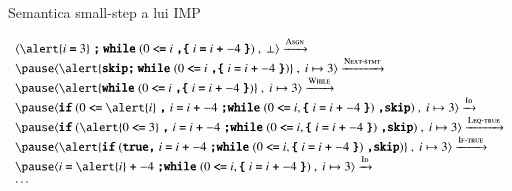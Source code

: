 \documentclass[xcolor=pdftex,romanian,colorlinks]{beamer}
\begin{document}
  \begin{frame}{Semantica small-step a lui IMP}


  \hspace*{-2em}$\begin{array}{l}
  \Conf{\alert{i \terminal{=} 3} \terminal{;}\ \Swhile (0 \terminal{<=} i \terminal{,}\terminal{\{} i \terminal{=} i \terminal{+} -4 \terminal{\}})}{\bot}\xrightarrow{\textsc{Asgn}}\\
  \pause
  \Conf{\alert{\terminal{skip} \terminal{;}\ \Swhile (0 \terminal{<=} i \terminal{,}\terminal{\{} i \terminal{=} i \terminal{+} -4 \terminal{\}})}}{i \mapsto 3}\xrightarrow{\textsc{Next-stmt}}\\
  \pause
  \Conf{\alert{\Swhile (0 \terminal{<=} i\terminal{,} \terminal{\{} i \terminal{=} i \terminal{+} -4 \terminal{\}})}}{i \mapsto 3}\xrightarrow{\textsc{While}}\\
  \pause
  \Conf{\Sif (0 \terminal{<=} \alert{i}\terminal{,}
 i \terminal{=} i \terminal{+} -4 \terminal{;} 
   \Swhile (0 \terminal{<=} i, \terminal{\{} i \terminal{=} i \terminal{+} -4\terminal{\}}) \terminal{,} \terminal{skip})}{i \mapsto 3}\xrightarrow{\textsc{Id}}\\
  \pause
   \Conf{\Sif (\alert{0 \terminal{<=} 3}\terminal{,}
 i \terminal{=} i \terminal{+} -4 \terminal{;} 
   \Swhile (0 \terminal{<=} i, \terminal{\{} i \terminal{=} i \terminal{+} -4\terminal{\}}) \terminal{,} \terminal{skip})}{i \mapsto 3} \xrightarrow{\textsc{Leq-true}}\\
  \pause
  \Conf{\alert{\Sif (\terminal{true}\terminal{,}
 i \terminal{=} i \terminal{+} -4 \terminal{;} 
   \Swhile (0 \terminal{<=} i, \terminal{\{} i \terminal{=} i \terminal{+} -4\terminal{\}}) \terminal{,} \terminal{skip})}}{i \mapsto 3}\xrightarrow{\textsc{If-true}}\\
  \pause
   \Conf{
 i \terminal{=} \alert{i} \terminal{+} -4 \terminal{;} 
   \Swhile (0 \terminal{<=} i, \terminal{\{} i \terminal{=} i \terminal{+} -4\terminal{\}})}{i \mapsto 3} \xrightarrow{\textsc{Id}}\\ \cdots
  \end{array}$
  \end{frame}
  
%
%
\end{document}
